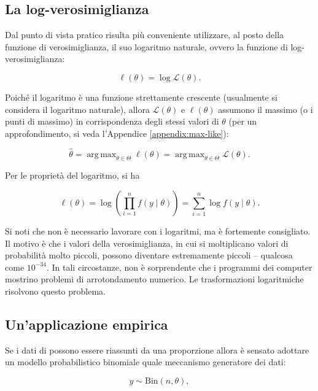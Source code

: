 \documentclass[
  11pt,
]{krantz}
\DeclareMathOperator{\argmax}{arg\,max}
\theoremstyle{definition}
\theoremstyle{definition}
\theoremstyle{definition}
\theoremstyle{definition}
\theoremstyle{remark}
\begin{document}
\hypertarget{la-log-verosimiglianza}{%
\subsection{La log-verosimiglianza}\label{la-log-verosimiglianza}}

Dal punto di vista pratico risulta più conveniente utilizzare, al posto della funzione di verosimiglianza, il suo logaritmo naturale, ovvero la funzione di log-verosimiglianza:

\begin{equation}
\ell(\theta) = \log \mathcal{L}(\theta).
\end{equation}

Poiché il logaritmo è una funzione strettamente crescente (usualmente si considera il logaritmo naturale), allora \(\mathcal{L}(\theta)\) e \(\ell(\theta)\) assumono il massimo (o i punti di massimo) in corrispondenza degli stessi valori di \(\theta\) (per un approfondimento, si veda l'Appendice \ref{appendix:max-like}):

\[
\hat{\theta} = \argmax_{\theta \in \Theta} \ell(\theta) = \argmax_{\theta \in \Theta} \mathcal{L}(\theta).
\]

Per le proprietà del logaritmo, si ha

\begin{equation}
\ell(\theta) = \log \left( \prod_{i = 1}^n f(y \mid \theta) \right) = \sum_{i = 1}^n \log f(y \mid \theta).
\end{equation}

Si noti che non è necessario lavorare con i logaritmi, ma è fortemente consigliato. Il motivo è che i valori della verosimiglianza, in cui si moltiplicano valori di probabilità molto piccoli, possono diventare estremamente piccoli -- qualcosa come \(10^{-34}\). In tali circostanze, non è sorprendente che i programmi dei computer mostrino problemi di arrotondamento numerico. Le trasformazioni logaritmiche risolvono questo problema.

\hypertarget{unapplicazione-empirica-1}{%
\subsection{Un'applicazione empirica}\label{unapplicazione-empirica-1}}

Se i dati di \citet{zetschefuture2019} possono essere riassunti da una proporzione allora è sensato adottare un modello probabilistico binomiale quale meccanismo generatore dei dati:

\begin{equation}
y  \sim \mbox{Bin}(n, \theta),
\label{eq:binomialmodel}
\end{equation}
\end{document}
